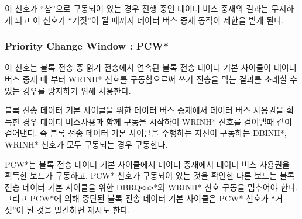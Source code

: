 이 신호가 ``참''으로 구동되어 있는 경우 진행 중인 데이터 버스 중재의
결과는 무시하게 되고 이 신호가 ``거짓''이 될 때까지 데이터 버스 중재 동작이
제한을 받게 된다.
%
\subsubsection{Priority Change Window : PCW*}
이 신호는 블록 전송 중 읽기 전송에서 연속된 블록 전송 데이터 기본 사이클이 데이터 버스 중재 때 부터
WRINH* 신호를 구동함으로써 쓰기 전송을 막는 결과를 초래할 수 있는 경우를 방지하기 위해 사용한다.

블록 전송 데이터 기본 사이클을 위한 데이터 버스 중재에서 데이터 버스 사용권을 획득한
경우 데이터 버스사용과 함께 구동을 시작하여 WRINH* 신호를 걷어낼때 같이 걷어낸다.
즉 블록 전송 데이터 기본 사이클을 수행하는 자신이 구동하는 DBINH*, WRINH* 신호가 모두
구동되는 경우 구동한다.
%

PCW*는 블록 전송 데이터 기본 사이클에서 데이터 중재에서 데이터 버스 사용권을 획득한
보드가 구동하고, PCW* 신호가 구동되어 있는 것을 확인한 다른 보드는 블록 전송 데이터 기본
사이클을 위한 DBRQ{\tt <}n{\tt >}*와 WRINH* 신호 구동을 멈추어야 한다.
그리고 PCW*에 의해 중단된 블록 전송 데이터 기본 사이클은 PCW* 신호가 ``거짓''이
된 것을 발견하면 재시도 한다.
%
